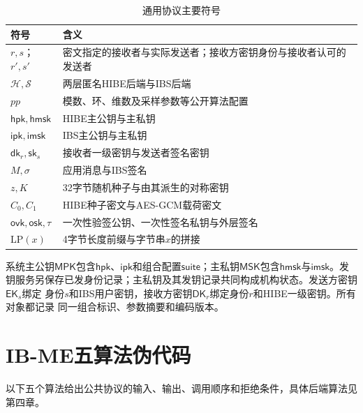 \begin{table}[H]
\centering\small
\caption{通用协议主要符号}
\label{tab:notations}
\begin{tabularx}{\textwidth}{@{}p{}X@{}}
\toprule
\rowcolor{black!8} 符号 & 含义 \\
\midrule
$r,s$；$r',s'$ & 密文指定的接收者与实际发送者；接收方密钥身份与接收者认可的发送者 \\
$\mathcal H,\mathcal S$ & 两层匿名HIBE后端与IBS后端 \\
$pp$ & 模数、环、维数及采样参数等公开算法配置 \\
$\mathsf{hpk},\mathsf{hmsk}$ & HIBE主公钥与主私钥 \\
$\mathsf{ipk},\mathsf{imsk}$ & IBS主公钥与主私钥 \\
$\mathsf{dk}_r,\mathsf{sk}_s$ & 接收者一级密钥与发送者签名密钥 \\
$M,\sigma$ & 应用消息与IBS签名 \\
$z,K$ & 32字节随机种子与由其派生的对称密钥 \\
$C_0,C_1$ & HIBE种子密文与AES-GCM载荷密文 \\
$\mathsf{ovk},\mathsf{osk},\tau$ & 一次性验签公钥、一次性签名私钥与外层签名 \\
$\mathrm{LP}(x)$ & 4字节长度前缀与字节串$x$的拼接 \\
\bottomrule
\end{tabularx}
\end{table}

系统主公钥$\mathsf{MPK}$包含$\mathsf{hpk}$、$\mathsf{ipk}$和组合配置$\mathsf{suite}$；主私钥$\mathsf{MSK}$包含$\mathsf{hmsk}$与$\mathsf{imsk}$。发钥服务另保存已发身份记录；主私钥及其发钥记录共同构成机构状态。发送方密钥$\mathsf{EK}_s$绑定
身份$s$和IBS用户密钥，接收方密钥$\mathsf{DK}_r$绑定身份$r$和HIBE一级密钥。所有对象都记录
同一组合标识、参数摘要和编码版本。

\section{IB-ME五算法伪代码}

以下五个算法给出公共协议的输入、输出、调用顺序和拒绝条件，具体后端算法见第四章。

